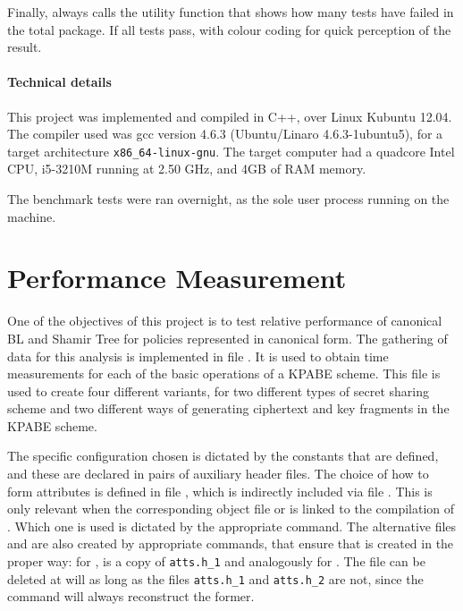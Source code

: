 \documentclass{article}
\begin{document}
Finally,  always calls the utility function  that shows how many tests have failed in the total package. If all tests pass, with colour coding for quick perception of the result.

\paragraph{Technical details}
This project was implemented and compiled in C++, over Linux Kubuntu 12.04.  The compiler used was gcc version 4.6.3 (Ubuntu/Linaro 4.6.3-1ubuntu5), for a target architecture \verb|x86_64-linux-gnu|. The target computer had a quadcore Intel CPU, i5-3210M running at 2.50 GHz, and 4GB of RAM memory.

The benchmark tests were ran overnight, as the sole user process running on the machine.


\section{Performance Measurement}

One of the objectives of this project is to test relative performance of canonical BL and Shamir Tree for policies represented in canonical form. The gathering of data for this analysis is implemented in file . It is used to obtain time measurements for each of the basic operations of a KPABE scheme. This file is used to create four different variants, for two different types of secret sharing scheme and two different ways of generating ciphertext and key fragments in the KPABE scheme. 

The specific configuration chosen is dictated by the constants that are defined, and these are declared in pairs of auxiliary header files. The choice of how to form attributes is defined in file , which is indirectly included via file . This is only relevant when the corresponding object file  or  is linked to the compilation of . Which one is used is dictated by the appropriate \fmake command. The alternative files  and  are also created by appropriate \fmake commands, that ensure that  is created in the proper way: for ,  is a copy of \verb|atts.h_1| and analogously for . 
The file  can be deleted at will as long as the files \verb|atts.h_1| and \verb|atts.h_2| are not, since the \fmake command will always reconstruct the former.
\end{document}
